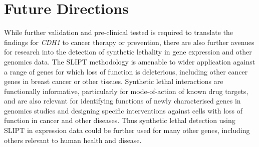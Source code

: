 \iffalse
\section{Evaluating the Synthetic Lethality Prediction Tool}
\label{chapt6:slipt}


\subsection{Strength of the Synthetic Lethality Prediction Tool}
\label{chapt6:slipt_strengths}

\subsection{Limitations of the Synthetic Lethality Prediction Tool}
\label{chapt6:slipt_limitations}

\subsection{Comparisons to Alternative Methods}
\label{chapt6:slipt_compare}

\subsubsection{Combined with Experimental Screening}
\label{chapt6:slipt_compare_experimental}

\subsubsection{Differences to Computational Methods}
\label{chapt6:slipt_compare_computational}
\fi

\section{Future Directions}
\label{chapt6:future}

While further validation and pre-clinical tested is required to translate the findings for \textit{CDH1} to cancer therapy or prevention, there are also further avenues for research into the detection of synthetic lethality in gene expression and other genomics data. The \gls{SLIPT} methodology is amenable to wider application against a range of genes for which loss of function is deleterious, including other cancer genes in breast cancer or other tissues. Synthetic lethal interactions are functionally informative, particularly for mode-of-action of known drug targets, and are also relevant for identifying functions of newly characterised genes in genomics studies and designing specific interventions against cells with loss of function in cancer and other diseases. Thus synthetic lethal detection using \gls{SLIPT} in expression data could be further used for many other genes, including others relevant to human health and disease.

